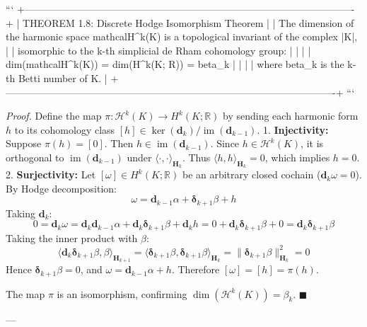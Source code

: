 \documentclass[11pt,twoside,openright]{amsbook}
\begin{document}
```
+----------------------------------------------------------------------------------------------------+
| THEOREM 1.8: Discrete Hodge Isomorphism Theorem                                                    |
| The dimension of the harmonic space mathcal{H}^k(K) is a topological invariant of the complex |K|,   |
| isomorphic to the k-th simplicial de Rham cohomology group:                                        |
|                                                                                                    |
|   dim(mathcal{H}^k(K)) = dim(H^k(K; R)) = beta_k                                                    |
|                                                                                                    |
| where beta_k is the k-th Betti number of K.                                                        |
+----------------------------------------------------------------------------------------------------+
```

\textit{Proof.} Define the map $\pi : \mathcal{H}^k(K) \to H^k(K; \mathbb{R})$ by sending each harmonic form $h$ to its cohomology class $[h] \in \ker(\mathbf{d}_k) / \operatorname{im}(\mathbf{d}_{k-1})$.
1. \textbf{Injectivity:} Suppose $\pi(h) = [0]$. Then $h \in \operatorname{im}(\mathbf{d}_{k-1})$. Since $h \in \mathcal{H}^k(K)$, it is orthogonal to $\operatorname{im}(\mathbf{d}_{k-1})$ under $\langle \cdot, \cdot \rangle_{\mathbf{H}_k}$. Thus $\langle h, h \rangle_{\mathbf{H}_k} = 0$, which implies $h = 0$.
2. \textbf{Surjectivity:} Let $[\omega] \in H^k(K; \mathbb{R})$ be an arbitrary closed cochain ($\mathbf{d}_k \omega = 0$). By Hodge decomposition:
   $$\omega = \mathbf{d}_{k-1} \alpha + \boldsymbol{\delta}_{k+1} \beta + h$$
   Taking $\mathbf{d}_k$:
   $$0 = \mathbf{d}_k \omega = \mathbf{d}_k \mathbf{d}_{k-1} \alpha + \mathbf{d}_k \boldsymbol{\delta}_{k+1} \beta + \mathbf{d}_k h = 0 + \mathbf{d}_k \boldsymbol{\delta}_{k+1} \beta + 0 = \mathbf{d}_k \boldsymbol{\delta}_{k+1} \beta$$
   Taking the inner product with $\beta$:
   $$\langle \mathbf{d}_k \boldsymbol{\delta}_{k+1} \beta, \beta \rangle_{\mathbf{H}_{k+1}} = \langle \boldsymbol{\delta}_{k+1} \beta, \boldsymbol{\delta}_{k+1} \beta \rangle_{\mathbf{H}_k} = \| \boldsymbol{\delta}_{k+1} \beta \|_{\mathbf{H}_k}^2 = 0$$
   Hence $\boldsymbol{\delta}_{k+1} \beta = 0$, and $\omega = \mathbf{d}_{k-1} \alpha + h$. Therefore $[\omega] = [h] = \pi(h)$.

The map $\pi$ is an isomorphism, confirming $\dim(\mathcal{H}^k(K)) = \beta_k$. $\blacksquare$

---
\end{document}

